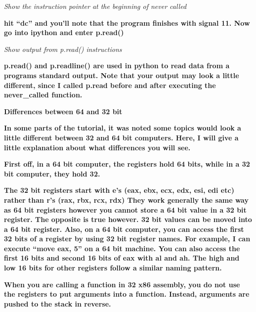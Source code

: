   
 

\textit{Show the instruction pointer at the beginning of never called}

\textbf{hit ``dc'' and you'll note that the program finishes with signal 11. Now go into ipython and enter p.read()}

  
 

\textit{Show output from p.read() instructions}

\textbf{p.read() and p.readline() are used in python to read data from a programs standard output. Note that your output
may look a little different, since I called p.read before and after executing the never\_called function.}

{\centering
\textbf{Differences between 64 and 32 bit}
\par}

\textbf{In some parts of the tutorial, it was noted some topics would look a little different between 32 and 64 bit
computers. Here, I will give a little explanation about what differences you will see. }

\textbf{First off, in a 64 bit computer, the registers hold 64 bits, while in a 32 bit computer, they hold 32. }

\textbf{The 32 bit registers start with e's (eax, ebx, ecx, edx, esi, edi etc) rather than r's (rax, rbx, rcx, rdx) They
work generally the same way as 64 bit registers however you cannot store a 64 bit value in a 32 bit register. The
opposite is true however. 32 bit values can be moved into a 64 bit register. Also, on a 64 bit computer, you can access
the first 32 bits of a register by using 32 bit register names. For example, I can execute ``move eax, 5'' on a 64 bit
machine. You can also access the first 16 bits and second 16 bits of eax with al and ah. The high and low 16 bits for
other registers follow a similar naming pattern. }

\textbf{When you are calling a function in 32 x86 assembly, you do not use the registers to put arguments into a
function. Instead, arguments are pushed to the stack in reverse. }

